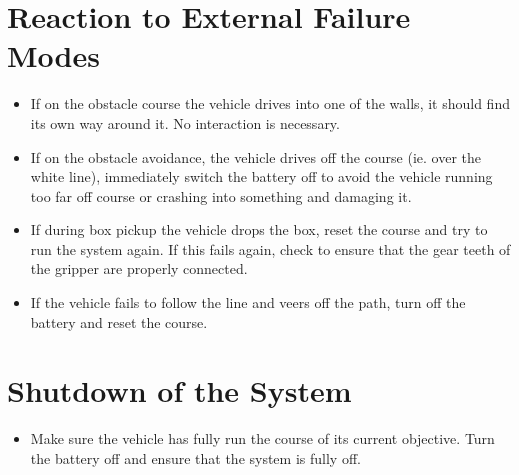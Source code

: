 \documentclass[11pt]{report}
\begin{document}
\section{Reaction to External Failure Modes}
\begin{itemize}
    \item If on the obstacle course the vehicle drives into one of the walls, it should find its own way around it. No interaction is necessary. 
    \item If on the obstacle avoidance, the vehicle drives off the course (ie. over the white line), immediately switch the battery off to avoid the vehicle running too far off course or crashing into something and damaging it.
    \item If during box pickup the vehicle drops the box, reset the course and try to run the system again. If this fails again, check to ensure that the gear teeth of the gripper are properly connected.
    \item If the vehicle fails to follow the line and veers off the path, turn off the battery and reset the course. 
\end{itemize}
\section{Shutdown of the System}
\begin{itemize}
    \item Make sure the vehicle has fully run the course of its current objective. Turn the battery off and ensure that the system is fully off.
\end{itemize}
\end{document}

